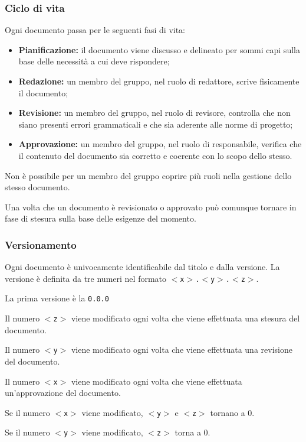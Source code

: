 \documentclass[a4paper, 12pt]{article}
\begin{document}
\subsubsection{Ciclo di vita}
Ogni documento passa per le seguenti fasi di vita:
\begin{itemize}
\item \textbf{Pianificazione:} il documento viene discusso e delineato per sommi capi sulla base delle necessità a cui deve rispondere;
\item \textbf{Redazione:} un membro del gruppo, nel ruolo di redattore, scrive fisicamente il documento;
\item \textbf{Revisione:} un membro del gruppo, nel ruolo di revisore, controlla che non siano presenti errori grammaticali e che sia aderente alle norme di progetto;
\item \textbf{Approvazione:} un membro del gruppo, nel ruolo di responsabile, verifica che il contenuto del documento sia corretto e coerente con lo scopo dello stesso.
\end{itemize}

Non è possibile per un membro del gruppo coprire più ruoli nella gestione dello stesso documento.

Una volta che un documento è revisionato o approvato può comunque tornare in fase di stesura sulla base delle esigenze del momento.

\subsubsection{Versionamento}
Ogni documento è univocamente identificabile dal titolo e dalla versione. La versione è definita da tre numeri nel formato \texttt{$<$x$>$.$<$y$>$.$<$z$>$}.

La prima versione è la \texttt{0.0.0}

Il numero \texttt{$<$z$>$} viene modificato ogni volta che viene effettuata una stesura del documento.

Il numero \texttt{$<$y$>$} viene modificato ogni volta che viene effettuata una revisione del documento.

Il numero \texttt{$<$x$>$} viene modificato ogni volta che viene effettuata un'approvazione del documento.

Se il numero \texttt{$<$x$>$} viene modificato, \texttt{$<$y$>$} e \texttt{$<$z$>$} tornano a 0.

Se il numero \texttt{$<$y$>$} viene modificato, \texttt{$<$z$>$} torna a 0.
\end{document}
